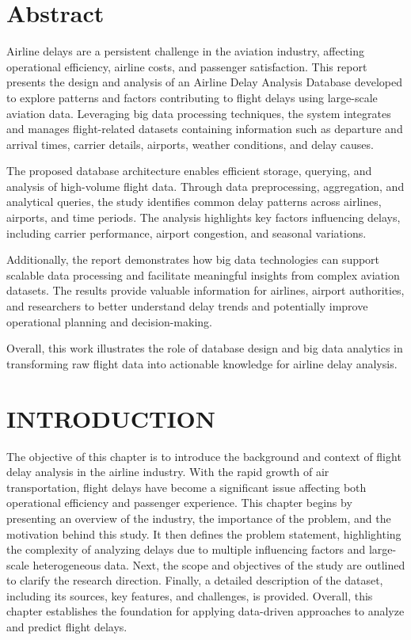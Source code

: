 \documentclass[12pt,a4paper]{report}
\begin{document}
\chapter*{Abstract}

Airline delays are a persistent challenge in the aviation industry, affecting operational efficiency, airline costs, and passenger satisfaction. This report presents the design and analysis of an Airline Delay Analysis Database developed to explore patterns and factors contributing to flight delays using large-scale aviation data. Leveraging big data processing techniques, the system integrates and manages flight-related datasets containing information such as departure and arrival times, carrier details, airports, weather conditions, and delay causes.

The proposed database architecture enables efficient storage, querying, and analysis of high-volume flight data. Through data preprocessing, aggregation, and analytical queries, the study identifies common delay patterns across airlines, airports, and time periods. The analysis highlights key factors influencing delays, including carrier performance, airport congestion, and seasonal variations.

Additionally, the report demonstrates how big data technologies can support scalable data processing and facilitate meaningful insights from complex aviation datasets. The results provide valuable information for airlines, airport authorities, and researchers to better understand delay trends and potentially improve operational planning and decision-making.

Overall, this work illustrates the role of database design and big data analytics in transforming raw flight data into actionable knowledge for airline delay analysis.

\newpage

\chapter{INTRODUCTION}

The objective of this chapter is to introduce the background and context of flight delay analysis in the airline industry. With the rapid growth of air transportation, flight delays have become a significant issue affecting both operational efficiency and passenger experience. This chapter begins by presenting an overview of the industry, the importance of the problem, and the motivation behind this study. It then defines the problem statement, highlighting the complexity of analyzing delays due to multiple influencing factors and large-scale heterogeneous data. Next, the scope and objectives of the study are outlined to clarify the research direction. Finally, a detailed description of the dataset, including its sources, key features, and challenges, is provided. Overall, this chapter establishes the foundation for applying data-driven approaches to analyze and predict flight delays.
\end{document}
